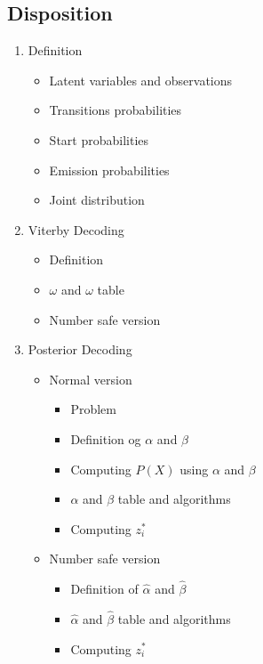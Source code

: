 \documentclass[a4, english]{article}
\begin{document}
\subsection{Disposition}
\begin{enumerate}
	\item Definition
  \begin{itemize}
  	\item Latent variables and observations
    \item Transitions probabilities
    \item Start probabilities 
    \item Emission probabilities
    \item Joint distribution
  \end{itemize}
  \item Viterby Decoding
  \begin{itemize}
  	\item Definition
    \item $\omega$ and $\omega$ table
    \item Number safe version
  \end{itemize}
  \item Posterior Decoding
  \begin{itemize}
  	\item Normal version
    \begin{itemize}
      \item Problem
    	\item Definition og $\alpha$ and $\beta$ 
      \item Computing $P(X)$ using $\alpha$ and $\beta$
      \item $\alpha$ and $\beta$ table and algorithms 
      \item Computing $z_i^*$ 
    \end{itemize}
    \item Number safe version
    \begin{itemize}
    	\item Definition of $\hat \alpha$ and $\hat \beta$  
      \item $\hat \alpha$ and $\hat \beta$ table and algorithms 
      \item Computing $z_i^*$ 
    \end{itemize}
  \end{itemize}
\end{enumerate}
\newpage
\end{document}
